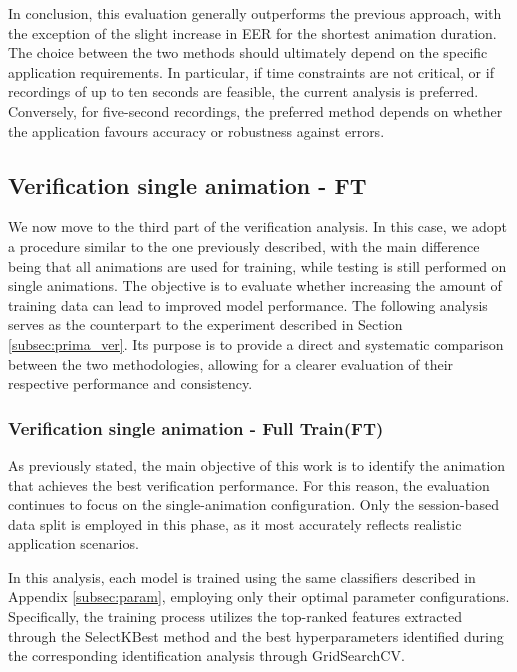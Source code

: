 \documentclass{article}
\begin{document}
In conclusion, this evaluation generally outperforms the previous approach, with the exception of the slight increase in EER for the shortest animation duration.
The choice between the two methods should ultimately depend on the specific application requirements. 
In particular, if time constraints are not critical, or if recordings of up to ten seconds are feasible, the current analysis is preferred. 
Conversely, for five-second recordings, the preferred method depends on whether the application favours accuracy or robustness against errors.
\FloatBarrier

\subsection{Verification single animation - FT}
\label{subsec:terza_ver}

We now move to the third part of the verification analysis.
In this case, we adopt a procedure similar to the one previously described, with the main difference being that all animations are used for training, while testing is still performed on single animations.
The objective is to evaluate whether increasing the amount of training data can lead to improved model performance.
The following analysis serves as the counterpart to the experiment described in Section \ref{subsec:prima_ver}. 
Its purpose is to provide a direct and systematic comparison between the two methodologies, allowing for a clearer evaluation of their respective performance and consistency.

\subsubsection{Verification single animation - Full Train(FT)}
\label{subsec:vft}

As previously stated, the main objective of this work is to identify the animation that achieves the best verification performance. 
For this reason, the evaluation continues to focus on the single-animation configuration. 
Only the session-based data split is employed in this phase, as it most accurately reflects realistic application scenarios.

In this analysis, each model is trained using the same classifiers described in Appendix \ref{subsec:param}, employing only their optimal parameter configurations. 
Specifically, the training process utilizes the top-ranked features extracted through the SelectKBest method and the best hyperparameters identified during the corresponding identification analysis through GridSearchCV.
\end{document}

